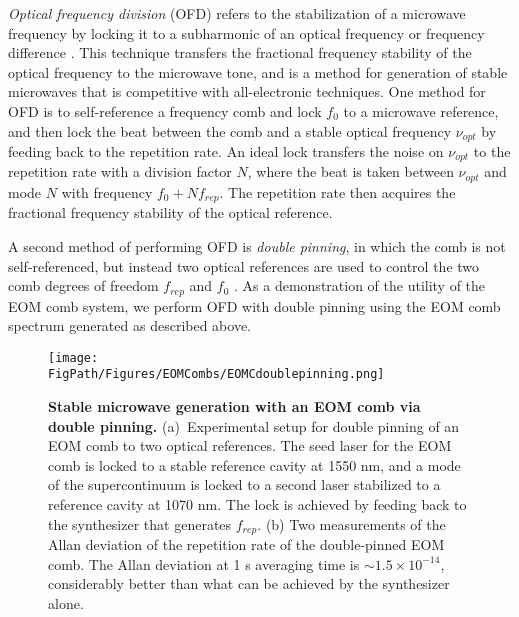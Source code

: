 \textit{Optical frequency division} (OFD) refers to the stabilization of a microwave frequency by locking it to a subharmonic of an optical frequency or frequency difference \cite{McFerran2005,Fortier2011}. This technique transfers the fractional frequency stability of the optical frequency to the microwave tone, and is a method for generation of stable microwaves that is competitive with all-electronic techniques. One method for OFD is to self-reference a frequency comb and lock $f_0$ to a microwave reference, and then lock the beat between the comb and a stable optical frequency $\nu_{opt}$ by feeding back to the repetition rate. An ideal lock transfers the noise on $\nu_{opt}$ to the repetition rate with a division factor $N$, where the beat is taken between $\nu_{opt}$ and mode $N$ with frequency $f_0+Nf_{rep}$. The repetition rate then acquires the fractional frequency stability of the optical reference.

A second method of performing OFD is \textit{double pinning}, in which the comb is not self-referenced, but instead two optical references are used to control the two comb degrees of freedom $f_{rep}$ and $f_0$ \cite{Swann2011,Papp2014,Li2014b}. As a demonstration of the utility of the EOM comb system, we perform OFD with double pinning using the EOM comb spectrum generated as described above.

\begin{figure}[htpb]
	\begin{center}
		\texttt{[image: \\FigPath/Figures/EOMCombs/EOMCdoublepinning.png]}
	\end{center}
	\caption[Stable microwave generation with an EOM comb via double pinning]{\textbf{Stable microwave generation with an EOM comb via double pinning.} (a)~Experimental setup for double pinning of an EOM comb to two optical references. The seed laser for the EOM comb is locked to a stable reference cavity at 1550 nm, and a mode of the supercontinuum is locked to a second laser stabilized to a reference cavity at 1070 nm. The lock is achieved by feeding back to the synthesizer that generates $f_{rep}$. (b) Two measurements of the Allan deviation of the repetition rate of the double-pinned EOM comb. The Allan deviation at 1 s averaging time is $\sim1.5\times10^{-14}$, considerably better than what can be achieved by the synthesizer alone.}
	\label{fig:EOMCdoublepinning}
\end{figure} 

